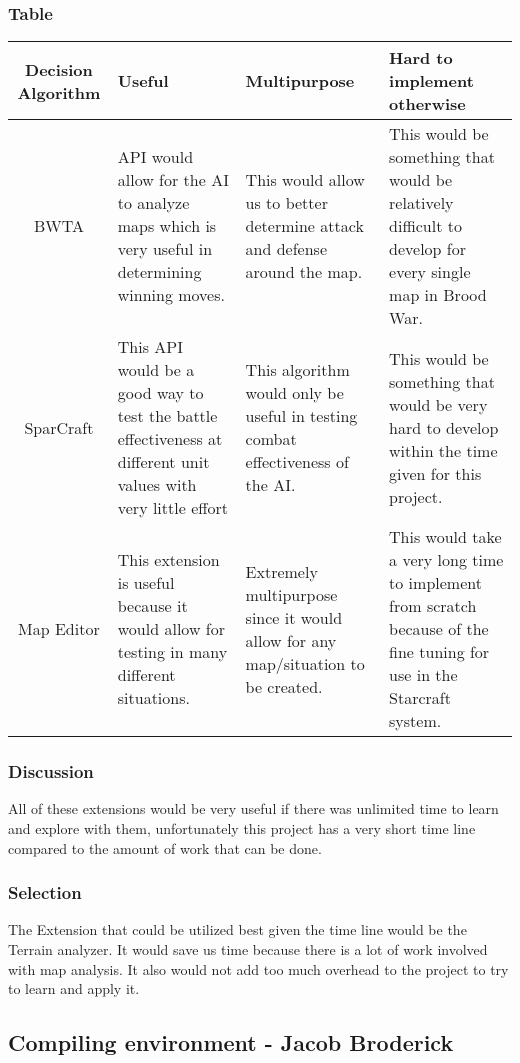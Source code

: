 \subsubsection{Table}
\begin{center}
	\begin{tabular}{ ||C|M|M|M|| } 
		\hline
		Decision Algorithm & Useful & Multipurpose & Hard to implement otherwise \\
		\hline
		BWTA & API would allow for the AI to analyze maps which is very useful in determining winning moves. & This would allow us to better determine attack and defense around the map. & This would be something that would be relatively difficult to develop for every single map in Brood War. \\ 
		\hline
		SparCraft & This API would be a good way to test the battle effectiveness at different unit values with very little effort & This algorithm would only be useful in testing combat effectiveness of the AI. & This would be something that would be very hard to develop within the time given for this project. \\ 
		\hline
		Map Editor & This extension is useful because it would allow for testing in many different situations. & Extremely multipurpose since it would allow for any map/situation to be created. & This would take a very long time to implement from scratch because of the fine tuning for use in the Starcraft system. \\ 
		\hline
	\end{tabular}
\end{center}
\subsubsection{Discussion}
All of these extensions would be very useful if there was unlimited time to learn and explore with them, unfortunately this project has a very short time line compared to the amount of work that can be done. 
\subsubsection{Selection}
The Extension that could be utilized best given the time line would be the Terrain analyzer. It would save us time because there is a lot of work involved with map analysis. It also would not add too much overhead to the project to try to learn and apply it.

\subsection{Compiling environment - Jacob Broderick}
